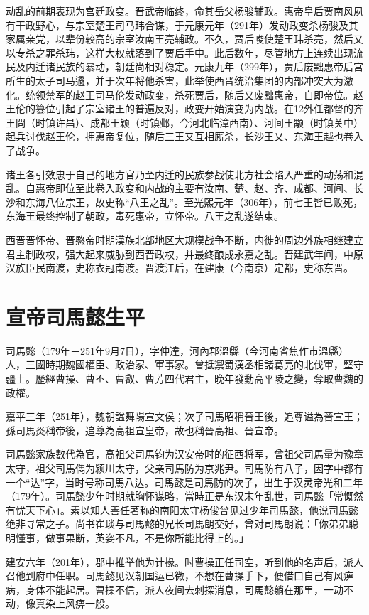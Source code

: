 动乱的前期表现为宫廷政变。晋武帝临终，命其岳父杨骏辅政。惠帝皇后贾南风夙有干政野心，与宗室楚王司马玮合谋，于元康元年（291年）发动政变杀杨骏及其家属亲党，以辈份较高的宗室汝南王亮辅政。不久，贾后唆使楚王玮杀亮，然后又以专杀之罪杀玮，这样大权就落到了贾后手中。此后数年，尽管地方上连续出现流民及内迁诸民族的暴动，朝廷尚相对稳定。元康九年（299年），贾后废黜惠帝后宫所生的太子司马遹，并于次年将他杀害，此举使西晋统治集团的内部冲突大为激化。统领禁军的赵王司马伦发动政变，杀死贾后，随后又废黜惠帝，自即帝位。赵王伦的篡位引起了宗室诸王的普遍反对，政变开始演变为内战。在12外任都督的齐王冏（时镇许昌）、成都王颖（时镇邺，今河北临漳西南）、河间王颙（时镇关中）起兵讨伐赵王伦，拥惠帝复位，随后三王又互相厮杀，长沙王乂、东海王越也卷入了战争。

诸王各引效忠于自己的地方官乃至内迁的民族参战使北方社会陷入严重的动荡和混乱。自惠帝即位至此卷入政变和内战的主要有汝南、楚、赵、齐、成都、河间、长沙和东海八位宗王，故史称“八王之乱”。至光熙元年（306年），前七王皆已败死，东海王最终控制了朝政，毒死惠帝，立怀帝。八王之乱遂结束。

西晋晋怀帝、晋愍帝时期漢族北部地区大规模战争不断，内徙的周边外族相继建立君主制政权，强大起来威胁到西晋政权，并最终酿成永嘉之乱。晋建武年间，中原汉族臣民南渡，史称衣冠南渡。晋渡江后，在建康（今南京）定都，史称东晋。

\section{宣帝司馬懿生平}

司馬懿（179年－251年9月7日），字仲達，河內郡溫縣（今河南省焦作市溫縣）人，三國時期魏國權臣、政治家、軍事家。曾抵禦蜀漢丞相諸葛亮的北伐軍，堅守疆土。歷經曹操、曹丕、曹叡、曹芳四代君主，晚年發動高平陵之變，奪取曹魏的政權。

嘉平三年（251年），魏朝諡舞陽宣文侯；次子司馬昭稱晉王後，追尊谥為晉宣王；孫司馬炎稱帝後，追尊為高祖宣皇帝，故也稱晉高祖、晉宣帝。

司馬懿家族數代為官，高祖父司馬钧为汉安帝时的征西将军，曾祖父司馬量为豫章太守，祖父司馬儁为颍川太守，父亲司馬防为京兆尹。司馬防有八子，因字中都有一个“达”字，当时号称司馬八达。司馬懿是司馬防的次子，出生于汉灵帝光和二年（179年）。司馬懿少年时期就胸怀谋略，當時正是东汉末年乱世，司馬懿「常慨然有忧天下心」。素以知人善任著称的南阳太守杨俊曾见过少年司馬懿，他说司馬懿绝非寻常之子。尚书崔琰与司馬懿的兄长司馬朗交好，曾对司馬朗说：「你弟弟聪明懂事，做事果断，英姿不凡，不是你所能比得上的。」

建安六年（201年），郡中推举他为计掾。时曹操正任司空，听到他的名声后，派人召他到府中任职。司馬懿见汉朝国运已微，不想在曹操手下，便借口自己有风痹病，身体不能起居。曹操不信，派人夜间去刺探消息，司馬懿躺在那里，一动不动，像真染上风痹一般。

